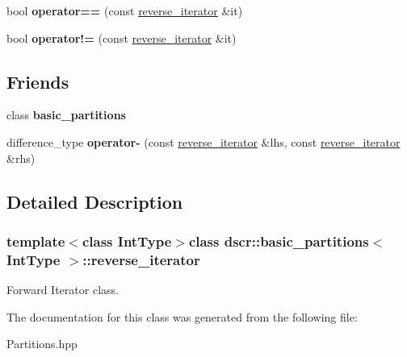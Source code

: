 \begin{DoxyCompactItemize}
\item 
\hypertarget{classdscr_1_1basic__partitions_1_1reverse__iterator_a9f6a5d577a5a626564e6c9398e19c155}{bool {\bfseries operator==} (const \hyperlink{classdscr_1_1basic__partitions_1_1reverse__iterator}{reverse\-\_\-iterator} \&it)}\label{classdscr_1_1basic__partitions_1_1reverse__iterator_a9f6a5d577a5a626564e6c9398e19c155}

\item 
\hypertarget{classdscr_1_1basic__partitions_1_1reverse__iterator_a0881f77607be7f6c75df751d47864ba1}{bool {\bfseries operator!=} (const \hyperlink{classdscr_1_1basic__partitions_1_1reverse__iterator}{reverse\-\_\-iterator} \&it)}\label{classdscr_1_1basic__partitions_1_1reverse__iterator_a0881f77607be7f6c75df751d47864ba1}

\end{DoxyCompactItemize}
\subsection*{Friends}
\begin{DoxyCompactItemize}
\item 
\hypertarget{classdscr_1_1basic__partitions_1_1reverse__iterator_aa61a5712b0e94d9ea6b10b06e861e942}{class {\bfseries basic\-\_\-partitions}}\label{classdscr_1_1basic__partitions_1_1reverse__iterator_aa61a5712b0e94d9ea6b10b06e861e942}

\item 
\hypertarget{classdscr_1_1basic__partitions_1_1reverse__iterator_a46fe9efd66cb5e2a2e89a93f2e060b82}{difference\-\_\-type {\bfseries operator-\/} (const \hyperlink{classdscr_1_1basic__partitions_1_1reverse__iterator}{reverse\-\_\-iterator} \&lhs, const \hyperlink{classdscr_1_1basic__partitions_1_1reverse__iterator}{reverse\-\_\-iterator} \&rhs)}\label{classdscr_1_1basic__partitions_1_1reverse__iterator_a46fe9efd66cb5e2a2e89a93f2e060b82}

\end{DoxyCompactItemize}


\subsection{Detailed Description}
\subsubsection*{template$<$class Int\-Type$>$class dscr\-::basic\-\_\-partitions$<$ Int\-Type $>$\-::reverse\-\_\-iterator}

Forward Iterator class. 

The documentation for this class was generated from the following file\-:\begin{DoxyCompactItemize}
\item 
Partitions.\-hpp\end{DoxyCompactItemize}
